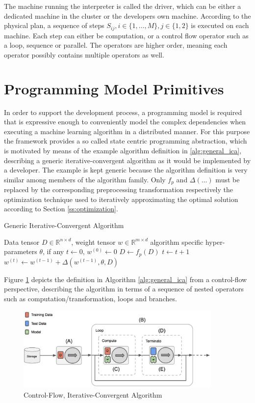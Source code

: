 The machine running the interpreter is called the driver, which can be either a dedicated machine in the cluster or the developers own machine.
According to the physical plan, a sequence of steps $S_{ij}, i \in \{1, \ldots, M\}, j \in \{1, 2\}$ is executed on each machine.
Each step can either be computation, or a control flow operator such as a loop, sequence or parallel.
The operators are higher order, meaning each operator possibly contains multiple operators as well.


\section{Programming Model Primitives}
In order to support the development process, a programming model is required that is expressive enough to conveniently model the complex dependencies when executing a machine learning algorithm in a distributed manner.
For this purpose the framework provides a so called state centric programming abstraction, which is motivated by means of the example algorithm definition in \eqref{alg:general_ica}, describing a generic iterative-convergent algorithm as it would be implemented by a developer.
The example is kept generic because the algorithm definition is very similar among members of the algorithm family.
Only $f_p$ and $\Delta(\ldots)$ must be replaced by the corresponding preprocessing transformation respectively the optimization technique used to iteratively approximating the optimal solution according to Section \ref{ss:optimization}.
\begin{algorithm}
\caption{Generic Iterative-Convergent Algorithm}\label{alg:general_ica}
\begin{algorithmic}[1]{}
\ALGSTATE Data tensor $D \in \mathbb{R}^{n \times d}$, weight tensor $w \in \mathbb{R}^{m \times d}$
\INPUT algorithm specific hyper-parameters $\theta$, if any
\INIT $t \gets 0$, $w^{(0)} \gets 0$
\State $D \gets f_{p}(D)$ 
\Repeat {}
\State $t \gets t + 1$
\State $w^{(t)} \gets w^{(t-1)} + \Delta(w^{(t-1)}, \theta, D)$ 
 
\end{algorithmic}
\end{algorithm}
Figure \ref{fig:ica_control_flow} depicts the definition in Algorithm \ref{alg:general_ica} from a control-flow perspective, describing the algorithm in terms of a sequence of nested operators such as computation/transformation, loops and branches.
\begin{figure}[ht]
\centering
\includegraphics[width=0.9\textwidth]{img/ica_control_flow.png}
\caption{Control-Flow, Iterative-Convergent Algorithm}
\label{fig:ica_control_flow}
\end{figure}
